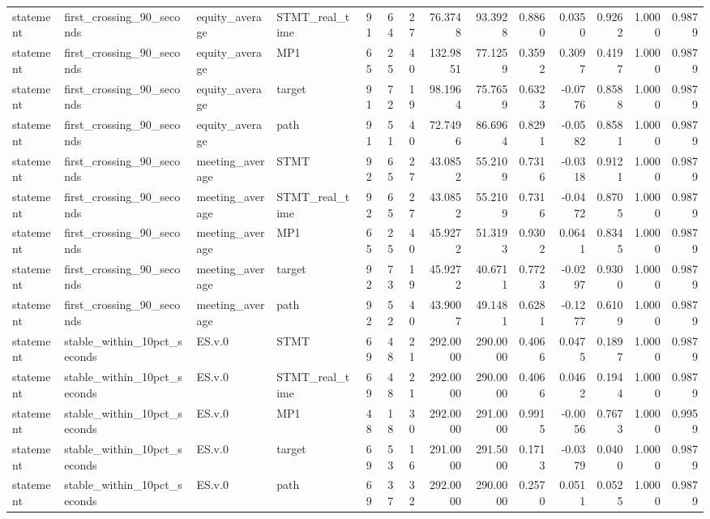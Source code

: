 \begin{tabular}{llllrrrrrrrrrr}
statement & first_crossing_90_seconds & equity_average & STMT_real_time & 91 & 64 & 27 & 76.3748 & 93.3928 & 0.8860 & 0.0350 & 0.9262 & 1.0000 & 0.9879 \\
statement & first_crossing_90_seconds & equity_average & MP1 & 65 & 25 & 40 & 132.9851 & 77.1259 & 0.3592 & 0.3097 & 0.4197 & 1.0000 & 0.9879 \\
statement & first_crossing_90_seconds & equity_average & target & 91 & 72 & 19 & 98.1964 & 75.7659 & 0.6323 & -0.0776 & 0.8588 & 1.0000 & 0.9879 \\
statement & first_crossing_90_seconds & equity_average & path & 91 & 51 & 40 & 72.7496 & 86.6964 & 0.8291 & -0.0582 & 0.8581 & 1.0000 & 0.9879 \\
statement & first_crossing_90_seconds & meeting_average & STMT & 92 & 65 & 27 & 43.0852 & 55.2109 & 0.7316 & -0.0318 & 0.9121 & 1.0000 & 0.9879 \\
statement & first_crossing_90_seconds & meeting_average & STMT_real_time & 92 & 65 & 27 & 43.0852 & 55.2109 & 0.7316 & -0.0472 & 0.8705 & 1.0000 & 0.9879 \\
statement & first_crossing_90_seconds & meeting_average & MP1 & 65 & 25 & 40 & 45.9272 & 51.3193 & 0.9302 & 0.0641 & 0.8345 & 1.0000 & 0.9879 \\
statement & first_crossing_90_seconds & meeting_average & target & 92 & 73 & 19 & 45.9272 & 40.6711 & 0.7723 & -0.0297 & 0.9300 & 1.0000 & 0.9879 \\
statement & first_crossing_90_seconds & meeting_average & path & 92 & 52 & 40 & 43.9007 & 49.1481 & 0.6281 & -0.1277 & 0.6109 & 1.0000 & 0.9879 \\
statement & stable_within_10pct_seconds & ES.v.0 & STMT & 69 & 48 & 21 & 292.0000 & 290.0000 & 0.4066 & 0.0475 & 0.1897 & 1.0000 & 0.9879 \\
statement & stable_within_10pct_seconds & ES.v.0 & STMT_real_time & 69 & 48 & 21 & 292.0000 & 290.0000 & 0.4066 & 0.0462 & 0.1944 & 1.0000 & 0.9879 \\
statement & stable_within_10pct_seconds & ES.v.0 & MP1 & 48 & 18 & 30 & 292.0000 & 291.0000 & 0.9915 & -0.0056 & 0.7673 & 1.0000 & 0.9959 \\
statement & stable_within_10pct_seconds & ES.v.0 & target & 69 & 53 & 16 & 291.0000 & 291.5000 & 0.1713 & -0.0379 & 0.0400 & 1.0000 & 0.9879 \\
statement & stable_within_10pct_seconds & ES.v.0 & path & 69 & 37 & 32 & 292.0000 & 290.0000 & 0.2570 & 0.0511 & 0.0525 & 1.0000 & 0.9879 \\

\end{tabular}
